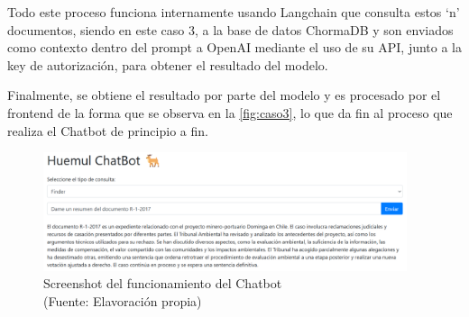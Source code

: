 \newpage

Todo este proceso funciona internamente usando Langchain que consulta estos ‘n’ documentos, siendo en este caso 3, a la base de datos 
ChormaDB y son enviados como contexto dentro del prompt a OpenAI mediante el uso de su API, junto a la key de autorización, 
para obtener el resultado del modelo.

Finalmente, se obtiene el resultado por parte del modelo y es procesado por el frontend de la forma que se observa en la \autoref{fig:caso3}, 
lo que da fin al proceso que realiza el Chatbot de principio a fin.


\begin{figure}[ht!]
    \centering
    \includegraphics[width=0.95\textwidth]{figures/website2.png}
    \caption[Screenshot del funcionamiento del Chatbot]{Screenshot del funcionamiento del Chatbot\\
    {\scriptsize (Fuente: Elavoración propia)}}
    \label{fig:caso3}
\end{figure}